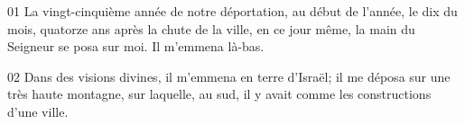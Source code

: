 01 La vingt-cinquième année de notre déportation, au début de l’année, le dix du mois, quatorze ans après la chute de la ville, en ce jour même, la main du Seigneur se posa sur moi. Il m’emmena là-bas.

02 Dans des visions divines, il m’emmena en terre d’Israël; il me déposa sur une très haute montagne, sur laquelle, au sud, il y avait comme les constructions d’une ville.
